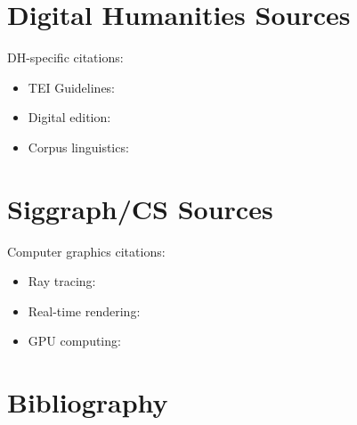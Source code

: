 \documentclass[12pt,a4paper]{article}
\begin{document}
\section{Digital Humanities Sources}\label{sec:dh}
DH-specific citations:
\begin{itemize}
    \item TEI Guidelines: \parencite{tei2020guidelines}
    \item Digital edition: \parencite{briscoe2017digital}
    \item Corpus linguistics: \parencite{mccarthy2010corpus}
\end{itemize}

\section{Siggraph/CS Sources}\label{sec:siggraph}
Computer graphics citations:
\begin{itemize}
    \item Ray tracing: \parencite{whitted1980improved}
    \item Real-time rendering: \parencite{akanine2018realtime}
    \item GPU computing: \parencite{nvidia2020cuda}
\end{itemize}

\section{Bibliography}\label{sec:bib}
\printbibliography[heading=none]
\end{document}
